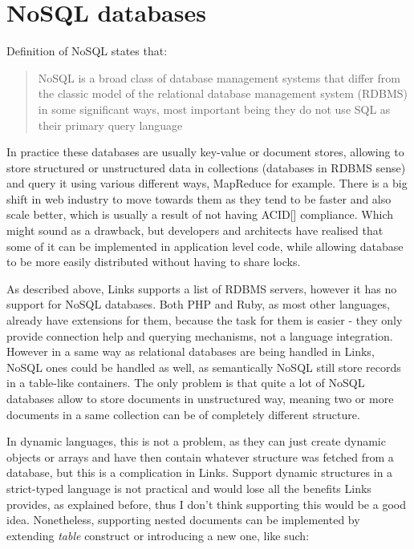 \section{NoSQL databases}

Definition of NoSQL states that:

\begin{quote}
NoSQL is a broad class of database management systems that differ from the classic model of the relational database management system (RDBMS) in some significant ways, most important being they do not use SQL as their primary query language
\end{quote}

In practice these databases are usually key-value or document stores, allowing to store structured or unstructured data in collections (databases in RDBMS sense) and query it using various different ways, MapReduce for example. There is a big shift in web industry to move towards them as they tend to be faster and also scale better, which is usually a result of not having ACID[] compliance. Which might sound as a drawback, but developers and architects have realised that some of it can be implemented in application level code, while allowing database to be more easily distributed without having to share locks. 

As described above, Links supports a list of RDBMS servers, however it has no support for NoSQL databases. Both PHP and Ruby, as most other languages, already have extensions for them, because the task for them is easier - they only provide connection help and querying mechanisms, not a language integration. However in a same way as relational databases are being handled in Links, NoSQL ones could be handled as well, as semantically NoSQL still store records in a table-like containers. The only problem is that quite a lot of NoSQL databases allow to store documents in unstructured way, meaning two or more documents in a same collection can be of completely different structure. 

In dynamic languages, this is not a problem, as they can just create dynamic objects or arrays and have then contain whatever structure was fetched from a database, but this is a complication in Links. Support dynamic structures in a strict-typed language is not practical and would lose all the benefits Links provides, as explained before, thus I don't think supporting this would be a good idea. Nonetheless, supporting nested documents can be implemented by extending \textit{table} construct or introducing a new one, like such:

